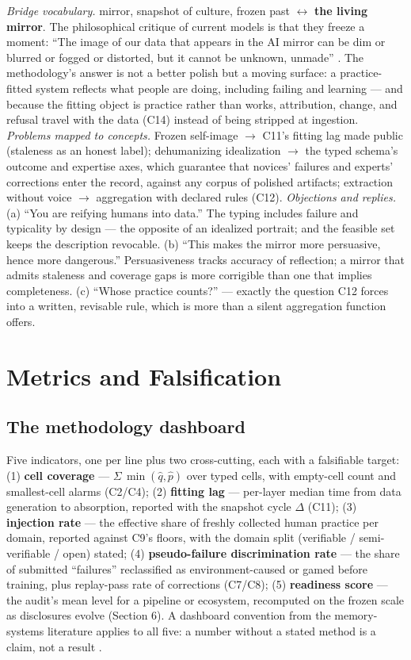 \documentclass[10pt]{article}
\begin{document}
\emph{Bridge vocabulary.} mirror, snapshot of culture, frozen past $\leftrightarrow$ \textbf{the living mirror}. The philosophical critique of current models is that they freeze a moment: ``The image of our data that appears in the AI mirror can be dim or blurred or fogged or distorted, but it cannot be unknown, unmade'' \cite{ref68}. The methodology's answer is not a better polish but a moving surface: a practice-fitted system reflects what people are doing, including failing and learning --- and because the fitting object is practice rather than works, attribution, change, and refusal travel with the data (C14) instead of being stripped at ingestion. \emph{Problems mapped to concepts.} Frozen self-image $\to$ C11's fitting lag made public (staleness as an honest label); dehumanizing idealization $\to$ the typed schema's outcome and expertise axes, which guarantee that novices' failures and experts' corrections enter the record, against any corpus of polished artifacts; extraction without voice $\to$ aggregation with declared rules (C12). \emph{Objections and replies.} (a) ``You are reifying humans into data.'' The typing includes failure and typicality by design --- the opposite of an idealized portrait; and the feasible set keeps the description revocable. (b) ``This makes the mirror more persuasive, hence more dangerous.'' Persuasiveness tracks accuracy of reflection; a mirror that admits staleness and coverage gaps is more corrigible than one that implies completeness. (c) ``Whose practice counts?'' --- exactly the question C12 forces into a written, revisable rule, which is more than a silent aggregation function offers.

\section{Metrics and Falsification}

\subsection{The methodology dashboard}

Five indicators, one per line plus two cross-cutting, each with a falsifiable target: (1) \textbf{cell coverage} --- $\Sigma\,\min(\hat{q},\hat{p})$ over typed cells, with empty-cell count and smallest-cell alarms (C2/C4); (2) \textbf{fitting lag} --- per-layer median time from data generation to absorption, reported with the snapshot cycle $\Delta$ (C11); (3) \textbf{injection rate} --- the effective share of freshly collected human practice per domain, reported against C9's floors, with the domain split (verifiable / semi-verifiable / open) stated; (4) \textbf{pseudo-failure discrimination rate} --- the share of submitted ``failures'' reclassified as environment-caused or gamed before training, plus replay-pass rate of corrections (C7/C8); (5) \textbf{readiness score} --- the audit's mean level for a pipeline or ecosystem, recomputed on the frozen scale as disclosures evolve (Section 6). A dashboard convention from the memory-systems literature applies to all five: a number without a stated method is a claim, not a result \cite{ref50}.
\end{document}
